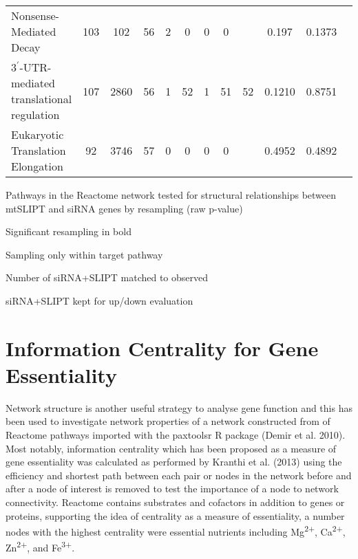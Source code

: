 \begin{table*}[!htb]
{{\begin{threeparttable}
\begin{tabular}{lccccccccccc}
  \rowcolor{black!5}
Nonsense-Mediated Decay                   & 103   & 102    & 56   & 2     & 0    & 0    & 0       &                   & 0.197  & 0.1373   \\
  \rowcolor{black!10}
3$^\prime$-UTR-mediated translational regulation & 107   & 2860   & 56   & 1     & 52   & 1    & 51      & 52                & 0.1210  & 0.8751   \\
  \rowcolor{black!5}
Eukaryotic Translation Elongation         & 92    & 3746   & 57   & 0     & 0    & 0    & 0       &                   & 0.4952 & 0.4892   \\ 
\hline
\end{tabular}
\begin{tablenotes}
\raggedright \small
Pathways in the Reactome network tested for structural relationships between mtSLIPT and siRNA genes by resampling (raw p-value)

Significant resampling in bold

Sampling only within target pathway

Number of siRNA+SLIPT matched to observed

siRNA+SLIPT kept for up/down evaluation 
\end{tablenotes}
\end{threeparttable}
}
}
\end{table*}


\FloatBarrier

\chapter{Information Centrality for Gene Essentiality}
\label{appendix:infocent_essential}

\FloatBarrier


Network structure is another useful strategy to analyse gene function and this has been used to investigate network properties of a network constructed from of Reactome pathways imported with the paxtoolsr R package (Demir et al. 2010). Most notably, information centrality which has been proposed as a measure of gene essentiality was calculated as performed by Kranthi et al. (2013) using the efficiency and shortest path between each pair or nodes in the network before and after a node of interest is removed to test the importance of a node to network connectivity. Reactome contains substrates and cofactors in addition to genes or proteins, supporting the idea of centrality as a measure of essentiality, a number nodes with the highest centrality were essential nutrients including Mg\textsuperscript{2$+$}, Ca\textsuperscript{2$+$}, Zn\textsuperscript{2$+$},  and Fe\textsuperscript{3$+$}.



